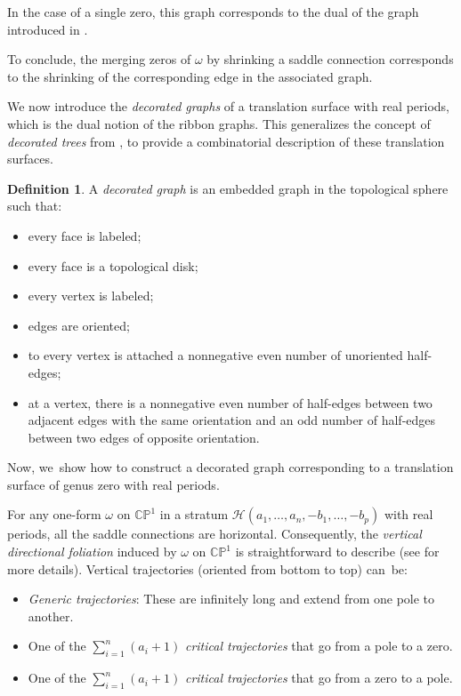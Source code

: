 \documentclass[11pt]{article}
\theoremstyle{definition}
\newtheorem{defn}[thm]{Definition}
\begin{document}
In the case of a single zero, this graph corresponds to the dual of the graph introduced in \cite{GeTaIso}.

To conclude, the merging zeros of $\omega$ by shrinking a saddle connection corresponds to the shrinking of the corresponding edge in the associated graph.

We now introduce the \textit{decorated graphs} of a translation surface with real periods, which is the dual notion of the ribbon graphs. This generalizes the concept of \textit{decorated trees} from \cite{GeTaIso}, to provide a combinatorial description of these translation surfaces.

\begin{defn}\label{defn:abstractdecoratedtgraph}
A \textit{decorated graph} is an embedded graph in the topological sphere such that:
\begin{itemize}
\item every face is labeled;
\item every face is a topological disk;
\item every vertex is labeled;
\item edges are oriented;
\item to every vertex is attached a nonnegative even number of unoriented half-edges;
\item at a vertex, there is a nonnegative even number of half-edges between two adjacent edges with the same orientation and an odd number of half-edges between two edges of opposite orientation.
\end{itemize}
\end{defn}

Now, we~show how to construct a decorated graph corresponding to a translation surface of genus zero with real periods.

For any one-form $\omega$ on $\mathbb{CP}^{1}$ in a stratum $\mathcal{H}(a_{1},\dots,a_{n},-b_{1},\dots,-b_{p})$ with real periods, all the saddle connections are horizontal. Consequently, the \textit{vertical directional foliation} induced by $\omega$ on $\mathbb{CP}^{1}$ is straightforward to describe (see \cite[Prop.\,5.5]{tahar} for more details). Vertical trajectories (oriented from bottom to top) can~be:
\begin{itemize}
\item \textit{Generic trajectories}: These are infinitely long and extend from one pole to another.
\item One of the $\sum_{i=1}^n (a_{i}+1)$ \textit{critical trajectories} that go from a pole to a zero.
\item One of the $\sum_{i=1}^n (a_{i}+1)$ \textit{critical trajectories} that go from a zero to a pole.
\end{itemize}
\end{document}
